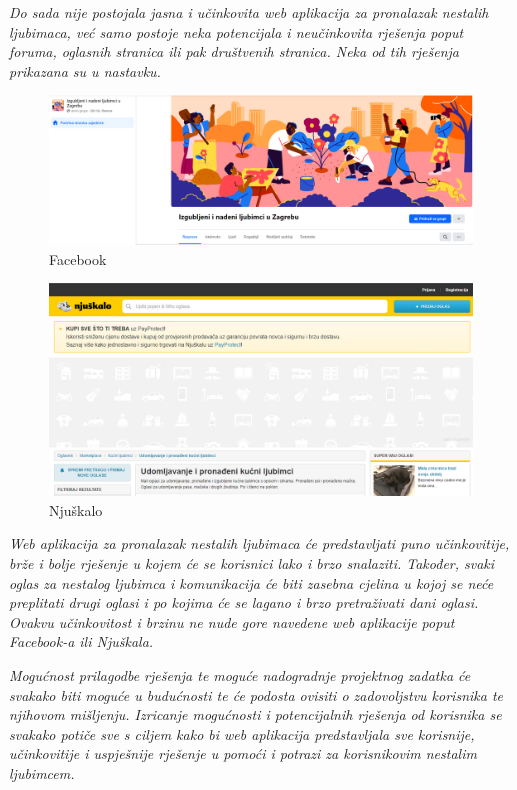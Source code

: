 		\textit{Do sada nije postojala jasna i učinkovita web aplikacija za pronalazak nestalih ljubimaca, već samo postoje neka potencijala i neučinkovita rješenja poput foruma, oglasnih stranica ili pak društvenih stranica. Neka od tih rješenja prikazana su u nastavku.}
	
		\begin{figure}[H]
			\centering
			\includegraphics[scale=0.3]{slike/Facebook-nestaliLjubimci.PNG}
			\caption{Facebook}
			\label{fig:promjene}
		\end{figure}
	
		\begin{figure}[H]
			\centering
			\includegraphics[scale=0.3]{slike/Njuskalo-nestaliLjubimci.PNG}
			\caption{Njuškalo}
			\label{fig:promjene}
		\end{figure}
		
		\textit{Web aplikacija za pronalazak nestalih ljubimaca će predstavljati puno učinkovitije, brže i bolje rješenje u kojem će se korisnici lako i brzo snalaziti. Također, svaki oglas za nestalog ljubimca i komunikacija će biti zasebna cjelina u kojoj se neće preplitati drugi oglasi i po kojima će se lagano i brzo pretraživati dani oglasi. Ovakvu učinkovitost i brzinu ne nude gore navedene web aplikacije poput Facebook-a ili Njuškala.}
		
		\textit{Mogućnost prilagodbe rješenja te moguće nadogradnje projektnog zadatka će svakako biti moguće u budućnosti te će podosta ovisiti o zadovoljstvu korisnika te njihovom mišljenju. Izricanje mogućnosti i potencijalnih rješenja od korisnika se svakako potiče sve s ciljem kako bi web aplikacija predstavljala sve korisnije, učinkovitije i uspješnije rješenje u pomoći i potrazi za korisnikovim nestalim ljubimcem.}
		
